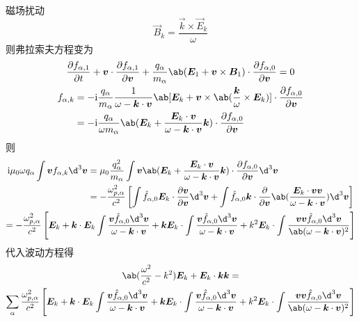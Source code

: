 磁场扰动
\begin{equation}
\vec{B}_k = \frac{\vec{k} \times \vec{E}_k}{\omega}
\end{equation}
则弗拉索夫方程变为
\begin{equation}\begin{gathered}
\pdv{f_{\alpha,1}}{t}
+ \vec{v} \cdot \pdv{f_{\alpha,1}}{\vec{v}}
+ \frac{q_\alpha}{m_\alpha} \ab(\vec{E}_1 + \vec{v}\times\vec{B}_1)
\cdot \pdv{f_{\alpha,0}}{\vec{v}}
= 0 \\
\begin{aligned}
f_{\alpha,k} &= -\im \frac{q_\alpha}{m_\alpha}
\frac{1}{\omega - \vec{k}\cdot\vec{v}} \ab[
\vec{E}_k + \vec{v} \times
\ab(\frac{\vec{k}}{\omega} \times \vec{E}_k)]
\cdot \pdv{f_{\alpha,0}}{\vec{v}} \\
&= -\im \frac{q_\alpha}{\omega m_\alpha} \ab(
    \vec{E}_k + \frac{\vec{E}_k \cdot \vec{v}}
    {\omega - \vec{k}\cdot\vec{v}} \vec{k}
) \cdot \pdv{f_{\alpha,0}}{\vec{v}}
\end{aligned}
\end{gathered}\end{equation}
则
\begin{equation}\begin{gathered}\begin{aligned}
\im\mu_0\omega q_\alpha \int \vec{v} f_{\alpha,k} \d^3\vec{v}
&= \mu_0 \frac{q_\alpha^2}{m_\alpha}
\int \vec{v} \ab(
    \vec{E}_k + \frac{\vec{E}_k \cdot \vec{v}}
    {\omega - \vec{k}\cdot\vec{v}} \vec{k}
)
\cdot \pdv{f_{\alpha,0}}{\vec{v}} \d^3\vec{v} \\
&= - \frac{\omega_{p,\alpha}^2}{c^2} \left[
\int \hat{f}_{\alpha,0} \vec{E}_k \cdot \pdv{\vec{v}}{\vec{v}} \d^3\vec{v}
+ \int \hat{f}_{\alpha,0} \vec{k} \cdot
    \pdv*{\ab(\frac{\vec{E}_k \cdot \vec{v}\vec{v}}
    {\omega-\vec{k}\cdot\vec{v}})}{\vec{v}}
\d^3\vec{v}
\right]\end{aligned} \\
= - \frac{\omega_{p,\alpha}^2}{c^2} \left[ \vec{E}_k
+ \vec{k} \cdot \vec{E}_k \int
    \frac{\vec{v} \hat{f}_{\alpha,0} \d^3\vec{v}}
    {\omega-\vec{k}\cdot\vec{v}}
+ \vec{k} \vec{E}_k \cdot \int
    \frac{\vec{v} \hat{f}_{\alpha,0} \d^3\vec{v}}
    {\omega-\vec{k}\cdot\vec{v}}
+ k^2 \vec{E}_k \cdot \int
    \frac{\vec{v}\vec{v} \hat{f}_{\alpha,0} \d^3\vec{v}}
    {\ab(\omega-\vec{k}\cdot\vec{v})^2}
\right]
\end{gathered}\end{equation}
代入波动方程得
\begin{equation}\begin{gathered}
\ab(\frac{\omega^2}{c^2} - k^2) \vec{E}_k
+ \vec{E}_k \cdot \vec{k}\vec{k}
= \\
\sum_\alpha \frac{\omega_{p,\alpha}^2}{c^2}
\left[ \vec{E}_k
+ \vec{k} \cdot \vec{E}_k \int
    \frac{\vec{v} \hat{f}_{\alpha,0} \d^3\vec{v}}
    {\omega-\vec{k}\cdot\vec{v}}
+ \vec{k} \vec{E}_k \cdot \int
    \frac{\vec{v} \hat{f}_{\alpha,0} \d^3\vec{v}}
    {\omega-\vec{k}\cdot\vec{v}}
+ k^2 \vec{E}_k \cdot \int
    \frac{\vec{v}\vec{v} \hat{f}_{\alpha,0} \d^3\vec{v}}
    {\ab(\omega-\vec{k}\cdot\vec{v})^2}
\right]
\end{gathered}\end{equation}
